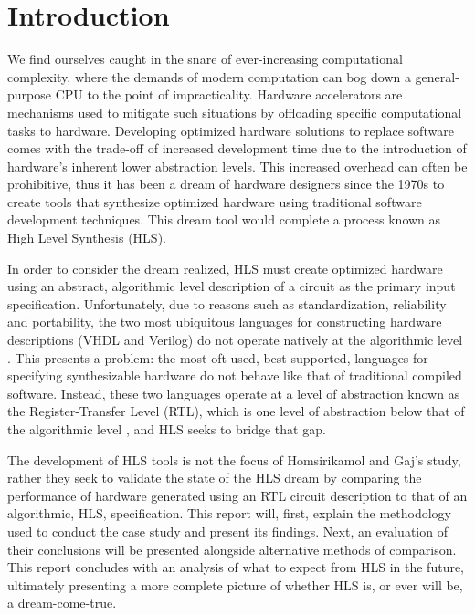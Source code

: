 \documentclass[onecolumn]{article}
\begin{document}
\section{Introduction}

We find ourselves caught in the snare of ever-increasing computational complexity, where the demands of modern computation can bog down a general-purpose CPU to the point of impracticality\cite{skalicky}. Hardware accelerators are mechanisms used to mitigate such situations by offloading specific computational tasks to hardware. Developing optimized hardware solutions to replace software comes with the trade-off of increased development time due to the introduction of hardware's inherent lower abstraction levels. This increased overhead can often be prohibitive, thus it has been a dream of hardware designers since the 1970s to create tools that synthesize optimized hardware using traditional software development techniques\cite{1}. This dream tool would complete a process known as High Level Synthesis (HLS).

In order to consider the dream realized, HLS must create optimized hardware using an abstract, algorithmic level description of a circuit as the primary input specification\cite{mcfarland}. Unfortunately, due to reasons such as standardization\cite{ieee}, reliability\cite{tosun} and portability\cite{churtl}, the two most ubiquitous languages for constructing hardware descriptions (VHDL and Verilog) do not operate natively at the algorithmic level \cite{Harris+Harris}. This presents a problem: the most oft-used, best supported, languages for specifying synthesizable hardware do not behave like that of traditional compiled software. Instead, these two languages operate at a level of abstraction known as the Register-Transfer Level (RTL), which is one level of abstraction below that of the algorithmic level \cite{vahid}, and HLS seeks to bridge that gap.

The development of HLS tools is not the focus of Homsirikamol and Gaj's study, rather they seek to validate the state of the HLS dream by comparing the performance of hardware generated using an RTL circuit description to that of an algorithmic, HLS, specification. This report will, first, explain the methodology used to conduct the case study and present its findings. Next, an evaluation of their conclusions will be presented alongside alternative methods of comparison. This report concludes with an analysis of what to expect from HLS in the future, ultimately presenting a more complete picture of whether HLS is, or ever will be, a dream-come-true.
\end{document}
